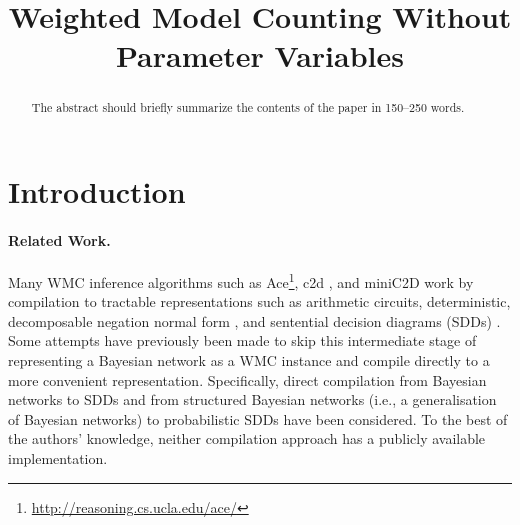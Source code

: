 \documentclass[runningheads]{llncs}
\begin{document}
\title{Weighted Model Counting Without Parameter Variables}





\maketitle              %

\begin{abstract}
  The abstract should briefly summarize the contents of the paper in
  150--250 words.

\end{abstract}

\section{Introduction}

\paragraph{Related Work.}
Many WMC inference algorithms such as
\textsf{Ace}\footnote{\url{http://reasoning.cs.ucla.edu/ace/}}, \textsf{c2d}
\cite{DBLP:conf/ecai/Darwiche04}, and \textsf{miniC2D}
\cite{DBLP:conf/ijcai/OztokD15} work by compilation to tractable representations
such as arithmetic circuits, deterministic, decomposable negation normal form
\cite{DBLP:journals/jancl/Darwiche01}, and sentential decision diagrams (SDDs)
\cite{DBLP:conf/ijcai/Darwiche11}. Some attempts have previously been made to
skip this intermediate stage of representing a Bayesian network as a WMC
instance and compile directly to a more convenient representation.
Specifically, direct compilation from Bayesian networks to SDDs
\cite{DBLP:conf/ecsqaru/ChoiKD13} and from structured Bayesian networks (i.e., a
generalisation of Bayesian networks) to probabilistic SDDs
\cite{shen2020modeling} have been considered. To the best of the authors'
knowledge, neither compilation approach has a publicly available implementation.
\end{document}
